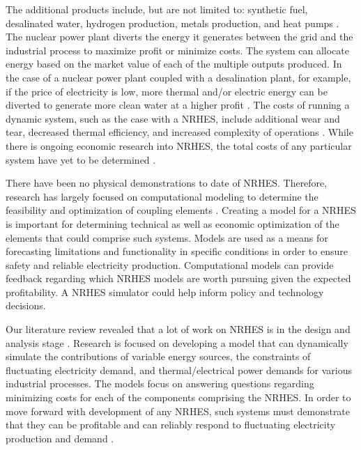 \documentclass{article}                                                                           %
\begin{document}
\begin{linenumbers}
The additional products include, but are not limited to: synthetic fuel, desalinated water, hydrogen production, metals production, and heat pumps \cite{Bienvenue2015}. The nuclear power plant diverts the energy it generates between the grid and the industrial process to maximize profit or minimize costs. The system can allocate energy based on the market value of each of the multiple outputs produced. In the case of a nuclear power plant coupled with a desalination plant, for example, if the price of electricity is low, more thermal and/or electric energy can be diverted to generate more clean water at a higher profit \cite {Chen2016}. The costs of running a dynamic system, such as the case with a NRHES, include additional wear and tear, decreased thermal efficiency, and increased complexity of operations \cite{Garcia2013}. While there is ongoing economic research into NRHES, the total costs of any particular system have yet to be determined \cite{Rabiti2015}.

There have been no physical demonstrations to date of NRHES. Therefore, research has largely focused on computational modeling to determine the feasibility and optimization of coupling elements \cite{Boardman2013, Shropshire2012}. Creating a model for a NRHES is important for determining technical as well as economic optimization of the elements that could comprise such systems. Models are used as a means for forecasting limitations and functionality in specific conditions in order to ensure safety and reliable electricity production. Computational models can provide feedback regarding which NRHES models are worth pursuing given the expected profitability. A NRHES simulator could help inform policy and technology decisions.

Our literature review revealed that a lot of work on NRHES is in the design and analysis stage \cite{Boardman2013, Shropshire2012}. Research is focused on developing a model that can dynamically simulate the contributions of variable energy sources, the constraints of fluctuating electricity demand, and thermal/electrical power demands for various industrial processes. The models focus on answering questions regarding minimizing costs for each of the components comprising the NRHES. In order to move forward with development of any NRHES,  such systems must demonstrate that they can be profitable and can reliably respond to fluctuating electricity production and demand \cite{Rabiti2015}.


\end{linenumbers}
\end{document}
